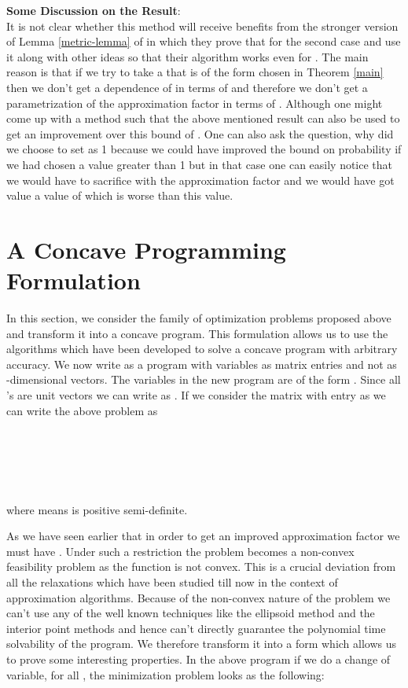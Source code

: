 \documentclass [11pt,a4paper]{article}
\begin{document}
\textbf{Some Discussion on the Result}: \\
It is not clear whether this method will receive 
benefits from the stronger version of Lemma \ref{metric-lemma} of \cite{ARV} in which they prove that 
for the second case  and use it along with other ideas
so that their algorithm works even for . The main
reason is that if we try to take a  that is of the form chosen in Theorem \ref{main}
then we don't get a dependence of  in terms of  and therefore we don't get a parametrization
of the approximation factor in terms of . Although one might come up with a method such that the above mentioned result 
can also be used to get an improvement over this bound of . One can also ask the 
question, why did we choose to set  as 1
because we could have improved the bound on probability if we had chosen a value greater than 1
but in that case one can easily notice that we would have to sacrifice with the approximation factor
and we would have got value a value of  which is worse than this value.

\section{A Concave Programming Formulation}
In this section, we consider the family of optimization problems  proposed above 
and transform it into a concave program. This formulation allows us to use the algorithms which have been developed
to solve a concave program with arbitrary accuracy. 
We now write  as a program with variables as matrix entries and not as -dimensional
vectors. The variables in the new program are of the form . Since all 's
are unit vectors we can write  as .
If we consider the matrix  with  entry as  we can write the above problem as

\begin{center}
\\
\\
 \\
 \\

\end{center}
where  means  is positive semi-definite. 

As we have seen earlier that in order to get an improved approximation factor 
we must have . Under such a restriction the problem becomes a non-convex 
feasibility problem as the function  is not convex. This 
is a crucial deviation from all the relaxations which have been studied till
now in the context of approximation algorithms. 
Because of the non-convex nature of the problem we can't use any of the 
well known techniques like the ellipsoid method and the interior point methods
and hence can't directly guarantee the polynomial time solvability of the program.
We therefore transform it into a form which allows us to prove some interesting properties. 
In the above program if we do a change of variable,   for all ,
the minimization problem looks as the following:
\end{document}
